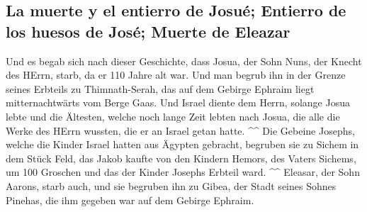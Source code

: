 \hypertarget{la-muerte-y-el-entierro-de-josuuxe9-entierro-de-los-huesos-de-josuxe9-muerte-de-eleazar}{%
\subsection{La muerte y el entierro de Josué; Entierro de los huesos de
José; Muerte de
Eleazar}\label{la-muerte-y-el-entierro-de-josuuxe9-entierro-de-los-huesos-de-josuxe9-muerte-de-eleazar}}

 Und es begab sich nach dieser Geschichte, dass Josua,
der Sohn Nuns, der Knecht des HErrn, starb, da er 110 Jahre alt war.
 Und man begrub ihn in der Grenze seines Erbteils zu
Thimnath-Serah, das auf dem Gebirge Ephraim liegt mitternachtwärts vom
Berge Gaas.  Und Israel diente dem Herrn, solange Josua
lebte und die Ältesten, welche noch lange Zeit lebten nach Josua, die
alle die Werke des HErrn wussten, die er an Israel getan hatte. \^{}\^{}
 Die Gebeine Josephs, welche die Kinder Israel hatten aus
Ägypten gebracht, begruben sie zu Sichem in dem Stück Feld, das Jakob
kaufte von den Kindern Hemors, des Vaters Sichems, um 100 Groschen und
das der Kinder Josephs Erbteil ward. \^{}\^{}  Eleasar,
der Sohn Aarons, starb auch, und sie begruben ihn zu Gibea, der Stadt
seines Sohnes Pinehas, die ihm gegeben war auf dem Gebirge Ephraim.
